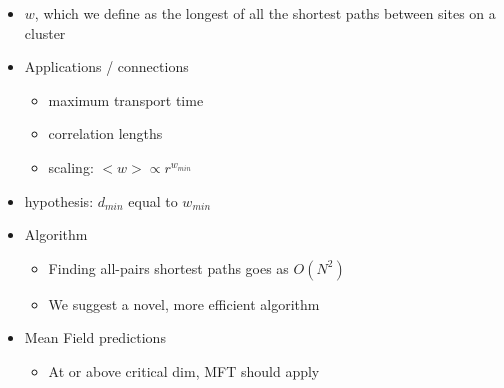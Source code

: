 \documentclass{umthesis}          %
\begin{document}
\begin{itemize}

\item $w$, which we define as the longest of all the shortest paths between sites on a cluster\\
\label{sec-4.1.3.1}


\item Applications / connections\\
\label{sec-4.1.3.2}

\begin{itemize}

\item maximum transport time\\
\label{sec-4.1.3.2.1}


\item correlation lengths\\
\label{sec-4.1.3.2.2}


\item scaling: $< w > \propto r^{w_{min}}$\\
\label{sec-4.1.3.2.3}

\end{itemize} %

\item hypothesis: $d_{min}$ equal to $w_{min}$\\
\label{sec-4.1.3.3}


\item Algorithm\\
\label{sec-4.1.3.4}

\begin{itemize}

\item Finding all-pairs shortest paths goes as $O(N^2)$\\
\label{sec-4.1.3.4.1}


\item We suggest a novel, more efficient algorithm\\
\label{sec-4.1.3.4.2}

\end{itemize} %

\item Mean Field predictions\\
\label{sec-4.1.3.5}

\begin{itemize}

\item At or above critical dim, MFT should apply\\
\label{sec-4.1.3.5.1}



\end{itemize}
\end{itemize}
\end{document}
